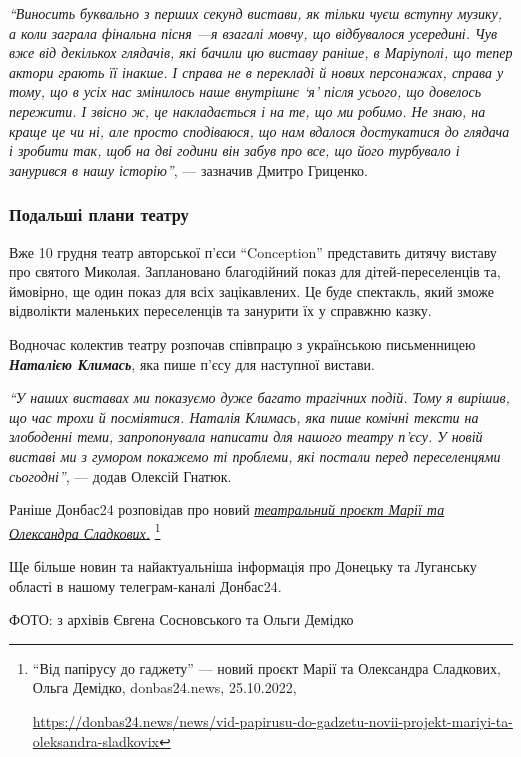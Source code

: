 \begin{leftbar}
  \begingroup
\emph{\enquote{Виносить буквально з перших секунд вистави, як тільки чуєш вступну
музику, а коли заграла фінальна пісня —я взагалі мовчу, що відбувалося
усередині. Чув вже від декількох глядачів, які бачили цю виставу
раніше, в Маріуполі, що тепер актори грають її інакше. І справа не в
перекладі й нових персонажах, справа у тому, що в усіх нас змінилось
наше внутрішнє \enquote{я} після усього, що довелось пережити. І звісно ж, це
накладається і на те, що ми робимо. Не знаю, на краще це чи ні, але
просто сподіваюся, що нам вдалося достукатися до глядача і зробити так,
щоб на дві години він забув про все, що його турбувало і занурився в
нашу історію}}, — зазначив Дмитро Гриценко.
   \endgroup
\end{leftbar}

\subsubsection{Подальші плани театру}

Вже 10 грудня театр авторської п'єси \enquote{Conception} представить дитячу
виставу про святого Миколая. Заплановано благодійний показ для
дітей-переселенців та, ймовірно, ще один показ для всіх зацікавлених. Це буде
спектакль, який зможе відволікти маленьких переселенців та занурити їх у
справжню казку.

Водночас колектив театру розпочав співпрацю з українською письменницею \emph{\textbf{Наталією
Климась}}, яка пише п'єсу для наступної вистави.

\begin{leftbar}
  \begingroup
\emph{\enquote{У наших виставах ми показуємо дуже багато трагічних подій. Тому я
вирішив, що час трохи й посміятися. Наталія Климась, яка пише комічні тексти на
злободенні теми, запропонувала написати для нашого театру п'єсу. У новій
виставі ми з гумором покажемо ті проблеми, які постали перед переселенцями
сьогодні}}, — додав Олексій Гнатюк.
   \endgroup
\end{leftbar}


Раніше Донбас24 розповідав про новий \href{https://donbas24.news/news/vid-papirusu-do-gadzetu-novii-projekt-mariyi-ta-oleksandra-sladkovix}{\emph{театральний проєкт Марії та Олександра
Сладкових.}}%
\footnote{\enquote{Від папірусу до гаджету} — новий проєкт Марії та Олександра Сладкових, Ольга Демідко, donbas24.news, %
25.10.2022, \par%
\url{https://donbas24.news/news/vid-papirusu-do-gadzetu-novii-projekt-mariyi-ta-oleksandra-sladkovix}%
}

Ще більше новин та найактуальніша інформація про Донецьку та Луганську області
в нашому телеграм-каналі Донбас24.

ФОТО: з архівів Євгена Сосновського та Ольги Демідко
